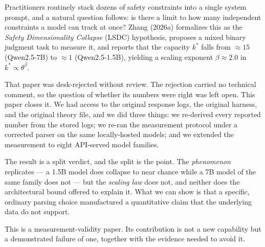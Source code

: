 \documentclass[preprint,12pt]{elsarticle}
\theoremstyle{plain}
\begin{document}
Practitioners routinely stack dozens of safety constraints into a single system prompt, and a natural question follows: is there a limit to how many independent constraints a model can track at once? Zhang (2026a) formalizes this as the \emph{Safety Dimensionality Collapse} (LSDC) hypothesis, proposes a mixed binary judgment task to measure it, and reports that the capacity $k^*$ falls from $\approx 15$ (Qwen2.5-7B) to $\approx 1$ (Qwen2.5-1.5B), yielding a scaling exponent $\beta \approx 2.0$ in $k^* \propto \theta^{\beta}$.

That paper was desk-rejected without review. The rejection carried no technical comment, so the question of whether its numbers were right was left open. This paper closes it. We had access to the original response logs, the original harness, and the original theory file, and we did three things: we re-derived every reported number from the stored logs; we re-ran the measurement protocol under a corrected parser on the same locally-hosted models; and we extended the measurement to eight API-served model families.

The result is a split verdict, and the split is the point. The \emph{phenomenon} replicates --- a 1.5B model does collapse to near chance while a 7B model of the same family does not --- but the \emph{scaling law} does not, and neither does the architectural bound offered to explain it. What we can show is that a specific, ordinary parsing choice manufactured a quantitative claim that the underlying data do not support.

This is a measurement-validity paper. Its contribution is not a new capability but a demonstrated failure of one, together with the evidence needed to avoid it.
\end{document}
